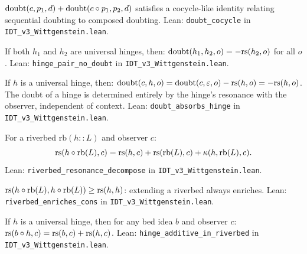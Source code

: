 \begin{theorem}
\label{thm:doubt-cocycle}
$\mathrm{doubt}(c, p_1, d) + \mathrm{doubt}(c \circ p_1, p_2, d)
$ satisfies a cocycle-like identity relating sequential doubting to
composed doubting.
Lean: \texttt{doubt\_cocycle} in \texttt{IDT\_v3\_Wittgenstein.lean}.
\end{theorem}

\begin{theorem}
\label{thm:hinge-pair-no-doubt}
If both $h_1$ and $h_2$ are universal hinges, then:
$\mathrm{doubt}(h_1, h_2, o) = -\mathrm{rs}(h_2, o)$ for all $o$.
Lean: \texttt{hinge\_pair\_no\_doubt} in \texttt{IDT\_v3\_Wittgenstein.lean}.
\end{theorem}

\begin{theorem}
\label{thm:doubt-absorbs-hinge}
If $h$ is a universal hinge, then:
$\mathrm{doubt}(c, h, o) = \mathrm{doubt}(c, \varepsilon, o) - \mathrm{rs}(h, o)
= -\mathrm{rs}(h, o)$.
The doubt of a hinge is determined entirely by the hinge's resonance with the
observer, independent of context.
Lean: \texttt{doubt\_absorbs\_hinge} in \texttt{IDT\_v3\_Wittgenstein.lean}.
\end{theorem}

\begin{theorem}
\label{thm:riverbed-decompose}
For a riverbed $\mathrm{rb}(h :: L)$ and observer $c$:
\[
\mathrm{rs}(h \circ \mathrm{rb}(L), c) = \mathrm{rs}(h, c) + \mathrm{rs}(\mathrm{rb}(L), c)
+ \kappa(h, \mathrm{rb}(L), c).
\]
Lean: \texttt{riverbed\_resonance\_decompose} in
\texttt{IDT\_v3\_Wittgenstein.lean}.
\end{theorem}

\begin{theorem}
\label{thm:riverbed-enrichment}
$\mathrm{rs}(h \circ \mathrm{rb}(L), h \circ \mathrm{rb}(L)) \geq \mathrm{rs}(h, h)$:
extending a riverbed always enriches.
Lean: \texttt{riverbed\_enriches\_cons} in \texttt{IDT\_v3\_Wittgenstein.lean}.
\end{theorem}

\begin{theorem}
\label{thm:hinge-additive-riverbed}
If $h$ is a universal hinge, then for any bed idea $b$ and observer $c$:
$\mathrm{rs}(b \circ h, c) = \mathrm{rs}(b, c) + \mathrm{rs}(h, c)$.
Lean: \texttt{hinge\_additive\_in\_riverbed} in
\texttt{IDT\_v3\_Wittgenstein.lean}.
\end{theorem}

